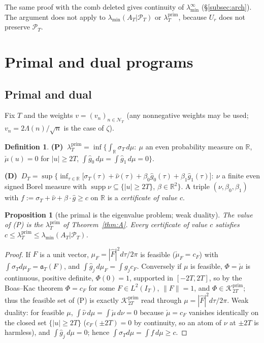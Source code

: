 \documentclass[11pt]{amsart}
\newtheorem{proposition}[theorem]{Proposition}
\theoremstyle{definition}
\newtheorem{definition}[theorem]{Definition}
\theoremstyle{remark}
\newcommand{\R}{\mathbb R}
\newcommand{\supp}{\operatorname{supp}}
\newcommand{\Kp}{\mathcal K^{\mathrm{prim}}_{2T}}
\newcommand{\PT}{\mathcal P_T}
\newcommand{\IT}{I_T}
\newcommand{\lamP}{\lambda^{\mathrm{prim}}_T}
\newcommand{\lamA}{\lambda_{\min}(A_T|\PT)}
\newcommand{\sT}{\sigma_T}
\newcommand{\gh}[1]{\widehat g_{#1}}
\newcommand{\nuh}{\widehat\nu}
\newcommand{\Fh}{\widehat F}
\newcommand{\cF}{c_F}
\newcommand{\NT}{\mathcal N_T}
\newcommand{\laminf}{\lambda^{\infty}_{\min}}
\begin{document}
The same proof with the comb deleted gives continuity of $\laminf$ (\S\ref{subsec:arch}). The
argument does not apply to $\lamA$ or $\lamP$, because $U_r$ does not preserve $\PT$.


\section{Primal and dual programs}\label{sec:duality}

\subsection{Primal and dual}
Fix $T$ and the weights $v=(v_n)_{n\in\NT}$ (any nonnegative weights may be used; $v_n=2\Lambda(n)/\sqrt n$
is the case of $\zeta$).

\begin{definition}\label{def:PD}
\textbf{(P)} $\ \lamP=\inf\big\{\int_\R\sT\,d\mu:\ \mu$ an even probability measure on $\R$,
$\check\mu(u)=0$ for $|u|\ge2T$, $\int\gh0\,d\mu=\int\gh1\,d\mu=0\big\}$.

\textbf{(D)} $\ D_T=\sup\big\{\inf_{\tau\in\R}\big[\sT(\tau)+\nuh(\tau)+\beta_0\gh0(\tau)+\beta_1\gh1(\tau)\big]:\
\nu$ a finite even signed Borel measure with $\supp\nu\subseteq\{|u|\ge2T\}$, $\beta\in\R^2\big\}$.
A triple $(\nu,\beta_0,\beta_1)$ with $f:=\sT+\nuh+\beta\cdot\widehat g\ge c$ on $\R$ is a
\emph{certificate of value $c$}.
\end{definition}

\begin{proposition}[the primal is the eigenvalue problem; weak duality]\label{prop:weak}
The value of \textup{(P)} is the $\lamP$ of Theorem~\ref{thm:A}. Every certificate of value $c$
satisfies $c\le\lamP\le\lamA$.
\end{proposition}
\begin{proof}
If $F$ is a unit vector, $\mu_F=|\Fh|^2d\tau/2\pi$ is feasible ($\check\mu_F=\cF$) with
$\int\sT d\mu_F=\mathfrak a_T(F)$, and $\int\gh j\,d\mu_F=\int g_j\cF$. Conversely if $\mu$ is
feasible, $\Phi=\check\mu$ is continuous, positive definite, $\Phi(0)=1$, supported in $[-2T,2T]$,
so by the Boas--Kac theorem \cite{BoasKac1945} $\Phi=\cF$ for some $F\in L^2(\IT)$, $\|F\|=1$, and
$\Phi\in\Kp$; thus the feasible set of (P) is exactly $\Kp$ read through $\mu=|\Fh|^2d\tau/2\pi$.
Weak duality: for feasible $\mu$, $\int\nuh\,d\mu=\int\check\mu\,d\nu=0$ because $\check\mu=\cF$
vanishes identically on the closed set $\{|u|\ge2T\}$ ($\cF(\pm2T)=0$ by continuity, so an atom
of $\nu$ at $\pm2T$ is harmless), and $\int\gh j\,d\mu=0$; hence
$\int\sT d\mu=\int f\,d\mu\ge c$.
\end{proof}
\end{document}
